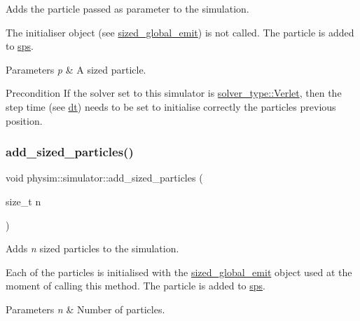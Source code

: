 Adds the particle passed as parameter to the simulation. 

The initialiser object (see \hyperlink{classphysim_1_1simulator_a61d4f20480309e95fce1db56b7fc8a88}{sized\+\_\+global\+\_\+emit}) is not called. The particle is added to \hyperlink{classphysim_1_1simulator_ad3bc00314e9fd8435125ff1225c0658b}{sps}.


\begin{DoxyParams}{Parameters}
{\em p} & A sized particle. \\
\hline
\end{DoxyParams}
\begin{DoxyPrecond}{Precondition}
If the solver set to this simulator is \hyperlink{namespacephysim_a09adeda29c09e651877e880d31fc9686ac1f9df543f33d8a79fb2437c853f09b9}{solver\+\_\+type\+::\+Verlet}, then the step time (see \hyperlink{classphysim_1_1simulator_a12a60d0ed819937b51ce50162dbdd6e1}{dt}) needs to be set to initialise correctly the particle\textquotesingle{}s previous position. 
\end{DoxyPrecond}
\mbox{\label{classphysim_1_1simulator_ae0551469d3c6b536da89bce04ff93fee}} 
\subsubsection{\texorpdfstring{add\+\_\+sized\+\_\+particles()}{add\_sized\_particles()}}
{\footnotesize\ttfamily void physim\+::simulator\+::add\+\_\+sized\+\_\+particles (\begin{DoxyParamCaption}\item[{size\+\_\+t}]{n }\end{DoxyParamCaption})}



Adds {\itshape n} sized particles to the simulation. 

Each of the particles is initialised with the \hyperlink{classphysim_1_1simulator_a61d4f20480309e95fce1db56b7fc8a88}{sized\+\_\+global\+\_\+emit} object used at the moment of calling this method. The particle is added to \hyperlink{classphysim_1_1simulator_ad3bc00314e9fd8435125ff1225c0658b}{sps}. 
\begin{DoxyParams}{Parameters}
{\em n} & Number of particles. \\
\hline
\end{DoxyParams}
\mbox{\label{classphysim_1_1simulator_a551890b383f97f13bb429e40f72c6c33}} 
